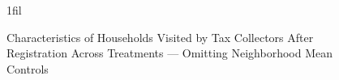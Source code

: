 \documentclass[12pt,english]{article}
\makeatletter
\newcommand*{\centerfloat}{%
  \parindent \z@
  \leftskip \z@ \@plus 1fil \@minus \textwidth
  \rightskip\leftskip
  \parfillskip \z@skip}
\makeatother
\begin{document}
\begin{figure}[H]
\centering{}\caption{Characteristics of Households Visited by Tax Collectors After Registration Across Treatments --- Omitting Neighborhood Mean Controls
\label{main_targeting_noControlMean_appendix}}
\centering
\centerfloat
{}
\usebox{\tablebox}\\[1ex]

\end{figure}
\end{document}
